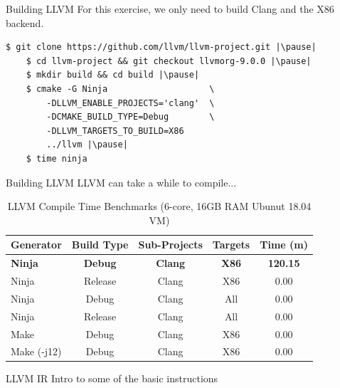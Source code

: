 \documentclass{beamer}
\begin{document}

\begin{frame}[fragile]{Building LLVM}
    For this exercise, we only need to build Clang and the X86 backend.

    \begin{lstlisting}[gobble=4]
    $ git clone https://github.com/llvm/llvm-project.git |\pause|
    $ cd llvm-project && git checkout llvmorg-9.0.0 |\pause|
    $ mkdir build && cd build |\pause|
    $ cmake -G Ninja                    \
        -DLLVM_ENABLE_PROJECTS='clang'  \
        -DCMAKE_BUILD_TYPE=Debug        \
        -DLLVM_TARGETS_TO_BUILD=X86
        ../llvm |\pause|
    $ time ninja

    \end{lstlisting}
\end{frame}


\begin{frame}{Building LLVM}
LLVM can take a while to compile...

    \begin{table}
        \centering %
        \begin{tabular}{l c c c c}
            \toprule
            Generator & Build Type & Sub-Projects & Targets & Time (m) \\
            \toprule
            \textbf{Ninja} & \textbf{Debug} & \textbf{Clang} & \textbf{X86} & \textbf{120.15} \\
            Ninja & Release & Clang & X86 & 0.00 \\
            Ninja & Debug & Clang & All & 0.00 \\
            Ninja & Release & Clang & All & 0.00 \\
            Make & Debug & Clang & X86 & 0.00 \\
            Make (-j12) & Debug & Clang & X86 & 0.00 \\
            \bottomrule
        \end{tabular}
        \caption{LLVM Compile Time Benchmarks (6-core, 16GB RAM Ubunut 18.04 VM)}
    \end{table}
\end{frame}


\begin{frame}{LLVM IR}
    Intro to some of the basic instructions
\end{frame}
\end{document}
